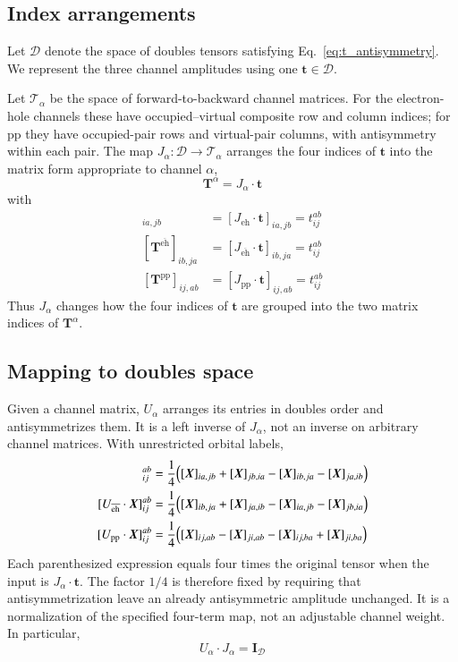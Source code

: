 \documentclass[aip,jcp,reprint,noshowkeys,superscriptaddress]{revtex4-1}
\newcommand{\eh}{\text{eh}}
\newcommand{\teh}{{\overline{\text{eh}}}}
\newcommand{\pp}{\text{pp}}
\newcommand{\bt}{\boldsymbol{t}}
\newcommand{\bT}{\boldsymbol{T}}
\newcommand{\bI}{\boldsymbol{I}}
\newcommand{\bX}{\boldsymbol{X}}
\begin{document}
\subsection{Index arrangements}

Let $\mathscr D$ denote the space of doubles tensors satisfying
Eq.~\eqref{eq:t_antisymmetry}. We represent the three channel amplitudes
using one $\bt\in\mathscr D$.

Let $\mathscr T_{\alpha}$ be the space of forward-to-backward channel matrices.
For the electron-hole channels these have occupied--virtual composite row and
column indices; for $\pp$ they have occupied-pair rows and virtual-pair
columns, with antisymmetry within each pair. The map
$J_{\alpha}:\mathscr D\to\mathscr T_{\alpha}$ arranges the four indices of $\bt$ into
the matrix form appropriate to channel $\alpha$,
\begin{equation}
    \bT^{\alpha}=J_{\alpha}\cdot\bt
    \label{eq:T_J_t}
\end{equation}
with
\begin{align}
    [\bT^{\eh}]_{ia,jb}
    &=[J_{\eh}\cdot\bt]_{ia,jb}
    =t_{ij}^{ab}
    \\
    [\bT^{\teh}]_{ib,ja}
    &=[J_{\teh}\cdot\bt]_{ib,ja}
    =t_{ij}^{ab}
    \\
    [\bT^{\pp}]_{ij,ab}
    &=[J_{\pp}\cdot\bt]_{ij,ab}
    =t_{ij}^{ab}
    \label{eq:common_t_maps}
\end{align}
Thus $J_{\alpha}$ changes how the four indices of $\bt$ are grouped into the
two matrix indices of $\bT^{\alpha}$.


\subsection{Mapping to doubles space}

Given a channel matrix, $U_{\alpha}$ arranges its entries in doubles order and
antisymmetrizes them. It is a left inverse of $J_{\alpha}$, not an inverse on
arbitrary channel matrices. With unrestricted orbital labels,
\begin{align}
    [U_{\eh}\cdot\bX]_{ij}^{ab}
    ={}&\frac14
    \qty(
        [\bX]_{ia,jb}+[\bX]_{jb,ia}-[\bX]_{ib,ja}-[\bX]_{ja,ib}
    )
    \label{eq:U_eh_map}
    \\
    [U_{\teh}\cdot\bX]_{ij}^{ab}
    ={}&\frac14
    \qty(
        [\bX]_{ib,ja}+[\bX]_{ja,ib}-[\bX]_{ia,jb}-[\bX]_{jb,ia}
    )
    \\
    [U_{\pp}\cdot\bX]_{ij}^{ab}
    ={}&\frac14
    \qty(
        [\bX]_{ij,ab}-[\bX]_{ji,ab}-[\bX]_{ij,ba}+[\bX]_{ji,ba}
    )
    \label{eq:U_maps}
\end{align}
Each parenthesized expression equals four times the original tensor when
the input is $J_{\alpha}\cdot\bt$. The factor $1/4$ is therefore fixed by requiring
that antisymmetrization leave an already antisymmetric amplitude unchanged.
It is a normalization of the specified four-term map, not an adjustable
channel weight. In particular,
\begin{equation}
    U_{\alpha}\cdot J_{\alpha}=\bI_{\mathscr D}
    \label{eq:left_inverse_identity}
\end{equation}
\end{document}
